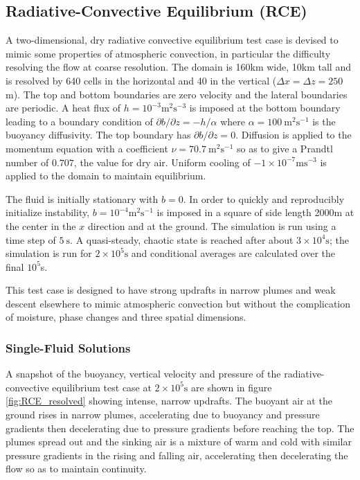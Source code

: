 \documentclass[draft]{agujournal2019}
\begin{document}
\subsection{Radiative-Convective Equilibrium (RCE)}

A two-dimensional, dry radiative convective equilibrium test case
is devised to mimic some properties of atmospheric convection, in
particular the difficulty resolving the flow at coarse resolution.
The domain is 160km wide, 10km tall and is resolved by 640 cells in
the horizontal and 40 in the vertical ($\Delta x=\Delta z=250$m).
The top and bottom boundaries are zero velocity and the lateral boundaries
are periodic. A heat flux of $h=10^{-3}\text{m}^{2}\text{s}^{-3}$
is imposed at the bottom boundary leading to a boundary condition
of $\partial b/\partial z=-h/\alpha$ where $\alpha=100\ \text{m}^{2}\text{s}^{-1}$
is the buoyancy diffusivity. The top boundary has $\partial b/\partial z=0$.
Diffusion is applied to the momentum equation with a coefficient $\nu=70.7\ \text{m}^{2}\text{s}^{-1}$
so as to give a Prandtl number of $0.707$, the value for dry air. Uniform cooling of $-1\times10^{-7}\text{m}\text{s}^{-3}$ is applied to the domain to maintain equilibrium.

The fluid is initially stationary with $b=0$. In order to quickly
and reproducibly initialize instability, $b=10^{-4}\text{m}^{2}\text{s}^{-1}$
is imposed in a square of side length 2000m at the center in the $x$
direction and at the ground. The simulation is run using a time step
of $5\ \text{s}$. A quasi-steady, chaotic state is reached after
about $3\times10^{4}\text{s}$; the simulation is run for $2\times10^{5}\text{s}$
and conditional averages are calculated over the final $10^{5}$s.

This test case is designed to have strong updrafts in narrow plumes
and weak descent elsewhere to mimic atmospheric convection but without
the complication of moisture, phase changes and three spatial dimensions.

\subsubsection{Single-Fluid Solutions}

A snapshot of the buoyancy, vertical velocity and pressure of the
radiative-convective equilibrium test case at $2\times10^{5}\text{s}$
are shown in figure \ref{fig:RCE_resolved} showing intense, narrow
updrafts. The buoyant air at the ground rises in narrow plumes,
accelerating due to buoyancy and pressure gradients then decelerating
due to pressure gradients before reaching the top. The plumes spread
out and the sinking air is a mixture of warm and cold with similar
pressure gradients in the rising and falling air, accelerating then
decelerating the flow so as to maintain continuity. 
\end{document}
